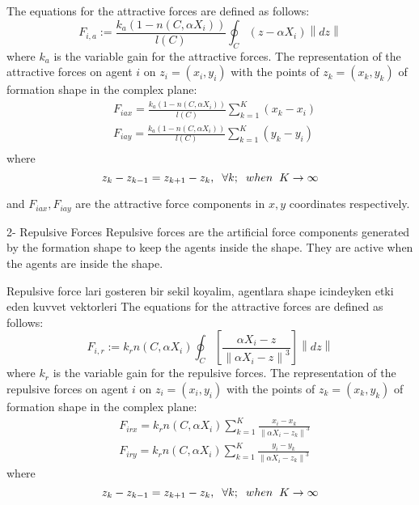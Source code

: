 \documentclass[twoside]{article}
\newcommand{\norm}[1]{\left\lVert#1\right\rVert}
\begin{document}
\begin{multicols}{2}
The equations for the attractive forces are defined as follows:			
			\begin{equation}
F_{i,a} := \frac{k_a (1-n(C,\alpha X_i))}{l(C)} \oint_C(z-\alpha X_i)\norm{dz}
			\end{equation}
			where $k_a$ is the variable gain for the attractive forces. The representation of the attractive forces on agent $i$ on $z_i = (x_i, y_i)$ with the points of  $z_k = (x_k,y_k)$ of formation shape in the complex plane:
			\begin{align*}
& F_{iax} =\frac{k_a (1-n(C,\alpha X_i))}{l(C)}  \sum_{k=1}^{K} (x_k  - x_i)\\
& F_{iay} =\frac{k_a (1-n(C,\alpha X_i))}{l(C)}  \sum_{k=1}^{K} (y_k  - y_i)\\
			\end{align*}
			where
		\begin{equation}
		z_k - z_{k-1} = z_{k+1} - z_k, \hspace{0.2cm}  \forall k ;  \hspace{0.2cm} when  \hspace{0.2cm} K \to\infty
		\end{equation}
			
			and $F_{iax} , F_{iay} $ are the attractive force components in $x,y$ coordinates respectively.
			
			2- Repulsive Forces
			Repulsive forces are the artificial force components generated by the formation shape to keep the agents inside the shape. They are active when the agents are inside the shape. 
					
						Repulsive force lari gosteren bir sekil koyalim, agentlara shape icindeyken etki eden kuvvet vektorleri
			The equations for the attractive forces are defined as follows:	
				\begin{equation}
F_{i,r} := k_r  n(C,\alpha X_i) \oint_C \left[\frac{\alpha X_i - z}{\norm{\alpha X_i - z}^3}\right] \norm{dz}
				\end{equation}
			where $k_r$ is the variable gain for the repulsive forces. The representation of the repulsive forces on agent $i$ on $z_i = (x_i, y_i)$ with the points of  $z_k = (x_k,y_k)$ of formation shape in the complex plane:
				\begin{align*}
				& F_{irx} = k_r n(C,\alpha X_i)  \sum_{k=1}^{K} \frac{x_i - x_k}{\norm{\alpha X_i - z_k}^3}\\
				& F_{iry} = k_r n(C,\alpha X_i)  \sum_{k=1}^{K} \frac{y_i - y_k}{\norm{\alpha X_i - z_k}^3}
				\end{align*}
						where
						\begin{equation}
						z_k - z_{k-1} = z_{k+1} - z_k, \hspace{0.2cm}  \forall k ;  \hspace{0.2cm} when  \hspace{0.2cm} K \to\infty
						\end{equation}
						

\end{multicols}
\end{document}

